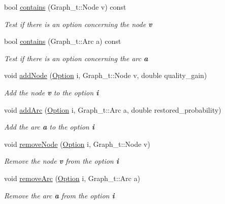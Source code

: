 \begin{DoxyCompactItemize}
bool \hyperlink{class_restoration_plan2_a753668d5ba34ea1e088aee85218543b7}{contains} (Graph\+\_\+t\+::\+Node v) const
\begin{DoxyCompactList}\small\item\em Test if there is an option concerning the node {\bfseries v} \end{DoxyCompactList}\item 
bool \hyperlink{class_restoration_plan2_acac88b4dcb361cf6ca3061457ff05bfa}{contains} (Graph\+\_\+t\+::\+Arc a) const
\begin{DoxyCompactList}\small\item\em Test if there is an option concerning the arc {\bfseries a} \end{DoxyCompactList}\item 
void \hyperlink{class_restoration_plan2_a0a5a2740cdea0ec03ffa9c5d1d94a202}{add\+Node} (\hyperlink{class_restoration_plan2_aff164a2726831342bf87af5e11df1064}{Option} i, Graph\+\_\+t\+::\+Node v, double quality\+\_\+gain)
\begin{DoxyCompactList}\small\item\em Add the node {\bfseries v} to the option {\bfseries i} \end{DoxyCompactList}\item 
void \hyperlink{class_restoration_plan2_a37dd2e978ecb5e36fa2c35e5025cf729}{add\+Arc} (\hyperlink{class_restoration_plan2_aff164a2726831342bf87af5e11df1064}{Option} i, Graph\+\_\+t\+::\+Arc a, double restored\+\_\+probability)
\begin{DoxyCompactList}\small\item\em Add the arc {\bfseries a} to the option {\bfseries i} \end{DoxyCompactList}\item 
void \hyperlink{class_restoration_plan2_a845fbee26cdfc01d689c7c24f55f0c31}{remove\+Node} (\hyperlink{class_restoration_plan2_aff164a2726831342bf87af5e11df1064}{Option} i, Graph\+\_\+t\+::\+Node v)
\begin{DoxyCompactList}\small\item\em Remove the node {\bfseries v} from the option {\bfseries i} \end{DoxyCompactList}\item 
void \hyperlink{class_restoration_plan2_a20f26b0167d527be6d60614b4cba4dbf}{remove\+Arc} (\hyperlink{class_restoration_plan2_aff164a2726831342bf87af5e11df1064}{Option} i, Graph\+\_\+t\+::\+Arc a)
\begin{DoxyCompactList}\small\item\em Remove the arc {\bfseries a} from the option {\bfseries i} \end{DoxyCompactList}\item 

\end{DoxyCompactItemize}
